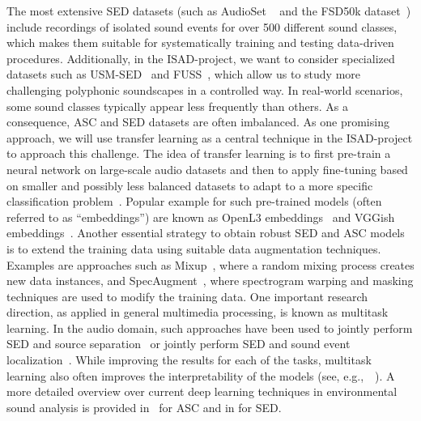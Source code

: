 \documentclass[11pt,a4paper]{article}
\def\PN{\mathrm{ISAD}}
\newcommand{\egc}{e.g.,\ }
\theoremstyle{plain} \newtheorem{define}{Definition}[section]
\begin{document}
{The most extensive SED datasets (such as AudioSet ~\cite{Gemmeke:2017:Audioset:ICASSP} and the FSD50k dataset~\cite{Fonseca:2020:FSD50K:ARXIV}) include recordings of isolated sound events for over 500 different sound classes, which makes them suitable for systematically training and testing data-driven procedures. Additionally, in the $\PN$-project, we want to consider specialized datasets such as USM-SED~\cite{Abesser:2021:USM-SED:ARXIV} and FUSS~\cite{Wisdom:2020:FUSS:ARXIV}, which allow us to study more challenging polyphonic soundscapes in a controlled way.
%
In real-world scenarios, some sound classes typically appear less frequently than others. As a consequence, ASC and SED datasets are often imbalanced. As one promising approach, we will use transfer learning as a central technique in the $\PN$-project to approach this challenge.
%
The idea of transfer learning is to first pre-train a neural network on large-scale audio datasets and then to apply fine-tuning based on smaller and possibly less balanced datasets to adapt to a more specific classification problem~\cite{Arora:2017:TransferLearning:IEEE_WMSP}. Popular example for such pre-trained models (often referred to as ``embeddings'') are known as OpenL3 embeddings~\cite{Cramer:2019:OpenL3:ICASSP} and VGGish embeddings~\cite{Hershey:2017:CNN:ICASSP}.
%
Another essential strategy to obtain robust SED and ASC models is to extend the training data using suitable data augmentation techniques. Examples are approaches such as Mixup~\cite{Zhang:2018:Mixup:ICLR}, where a random mixing process creates new data instances, and SpecAugment~\cite{Park:2019:SpecAugment:INTERSPEECH}, where spectrogram warping and masking techniques are used to modify the training data.
%
One important research direction, as applied in general multimedia processing, is known as multitask learning. In the audio domain, such approaches have been used to jointly perform SED and source separation~\cite{Sudo:2019:EnvSoundSeg:IROS, Tzinis:2020:SED_SS:ICASSP} or jointly perform SED and sound event localization~\cite{Politis:2021:SEL:TASLP}. While improving the results for each of the tasks, multitask learning also often improves the interpretability of the models (see, \egc~\cite{Zinemanas:2021:InterpretableSED:ELECTRONICS}). A more detailed overview over current deep learning techniques in environmental sound analysis is provided in~\cite{Abesser20_AcousticSceneClassification_AppliedSciences} for ASC and in  \cite{Dang:2017:SurveyAED:ICOT, Xia:2019:EventDetection:CSSR} for SED.

}
\end{document}
